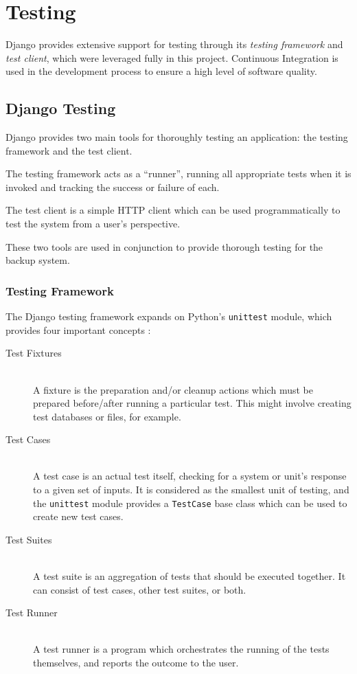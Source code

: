 \chapter{Testing}
\label{sec:testing}

Django provides extensive support for testing through its \emph{testing
framework} and \emph{test client}, which were leveraged fully in this project.
Continuous Integration is used in the development process to ensure a high
level of software quality.

\section{Django Testing}
\label{sec:testing-django}

Django provides two main tools for thoroughly testing an application: the
testing framework and the test client.

The testing framework acts as a ``runner'', running all appropriate tests when
it is invoked and tracking the success or failure of each.

The test client is a simple HTTP client which can be used programmatically to
test the system from a user's perspective.

These two tools are used in conjunction to provide thorough testing for the
backup system.

\subsection{Testing Framework}
\label{sec:testing-django-framework}

The Django testing framework expands on Python's \verb!unittest! module, which
provides four important concepts \cite{unittest}:

\begin{description}
  \item[Test Fixtures] \hfill \\
      A fixture is the preparation and/or cleanup actions which must be
      prepared before/after running a particular test. This might involve
      creating test databases or files, for example.
  \item[Test Cases] \hfill \\
      A test case is an actual test itself, checking for a system or unit's
      response to a given set of inputs. It is considered as the smallest unit
      of testing, and the \verb!unittest! module provides a \verb!TestCase!
      base class which can be used to create new test cases.
  \item[Test Suites] \hfill \\
      A test suite is an aggregation of tests that should be executed together.
      It can consist of test cases, other test suites, or both.
  \item[Test Runner] \hfill \\
      A test runner is a program which orchestrates the running of the tests
      themselves, and reports the outcome to the user.
\end{description}

